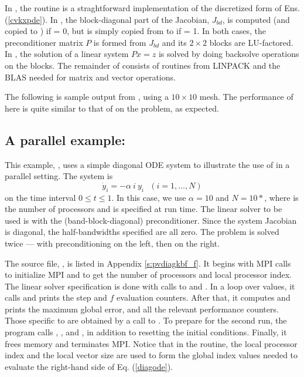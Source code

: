 In , the  routine is a straghtforward implementation
of the discretized form of Ens. (\ref{cvkxpde}).  In , the
block-diagonal part of the Jacobian, $J_{bd}$, is computed (and copied to
) if  = 0, but is simply copied from  to  if
 = 1.  In both cases, the preconditioner matrix $P$ is formed from 
$J_{bd}$ and its $2 \times 2$ blocks are LU-factored.  In ,
the solution of a linear system $Px = z$ is solved by doing backsolve
operations on the blocks.  The remainder of  consists of
routines from LINPACK and the BLAS needed for matrix and vector operations.

The following is sample output from , using a $10 \times 10$ mesh.
The performance of {\fcvode} here is quite similar to that of {\cvode} on
the  problem, as expected.



\subsection{A parallel example: }\label{ss:pvdiagkbf}

This example, , uses a simple diagonal ODE system to illustrate
the use of {\fcvode} in a parallel setting.  The system is
\begin{equation} \label{diagode}
\dot{y}_i = - \alpha ~i~ y_i ~~~ (i = 1,\ldots, N)
\end{equation}
on the time interval $0 \leq t \leq 1$.  In this case, we use $\alpha = 10$
and $N = 10*$, where  is the number of processors
and is specified at run time.  The linear solver to be used is
{\spgmr} with the {\cvbbdpre} (band-block-diagonal) preconditioner.
Since the system Jacobian is diagonal, the half-bandwidths specified
are all zero.  The problem is solved twice --- with preconditioning on
the left, then on the right.

The source file, , is listed in Appendix \ref{s:pvdiagkbf_f}.
It begins with MPI calls to initialize MPI and to get the number of processors
and local processor index.  The linear solver specification is done with
calls to  and .  In a loop over 
values, it calls  and prints the step and $f$ evaluation counters.
After that, it computes and prints the maximum global error, and all the
relevant performance counters.  Those specific to {\cvbbdpre} are obtained
by a call to .  To prepare for the second run, the program
calls , , and , in addition
to resetting the initial conditions.  Finally, it frees memory and terminates MPI.
Notice that in the  routine, the local processor index 
and the local vector size  are used to form the global index
values needed to evaluate the right-hand side of Eq. (\ref{diagode}).

